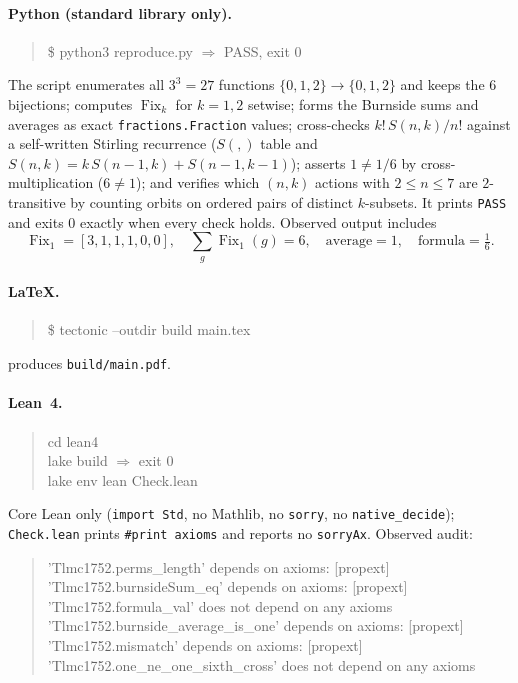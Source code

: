 \documentclass[11pt]{article}
\theoremstyle{definition}
\theoremstyle{remark}
\newcommand{\Fix}{\operatorname{Fix}}
\newcommand{\Stir}[2]{S(#1,#2)}
\begin{document}
\paragraph{Python (standard library only).}
\begin{quote}\ttfamily
\$ python3 reproduce.py   $\Rightarrow$   PASS, exit 0
\end{quote}
The script enumerates all $3^3=27$ functions $\{0,1,2\}\to\{0,1,2\}$ and keeps
the $6$ bijections; computes $\Fix_k$ for $k=1,2$ setwise; forms the Burnside
sums and averages as exact \texttt{fractions.Fraction} values; cross-checks
$k!\,\Stir{n}{k}/n!$ against a self-written Stirling recurrence
($\Stir{}{}$ table and $\Stir{n}{k}=k\,\Stir{n-1}{k}+\Stir{n-1}{k-1}$); asserts
$1 \ne 1/6$ by cross-multiplication ($6 \ne 1$); and verifies which $(n,k)$
actions with $2 \le n \le 7$ are $2$-transitive by counting orbits on ordered
pairs of distinct $k$-subsets. It prints \texttt{PASS} and exits $0$ exactly
when every check holds. Observed output includes
\[
\Fix_1 = [3,1,1,1,0,0],\quad \textstyle\sum_g \Fix_1(g)=6,\quad \text{average}=1,
\quad \text{formula}=\tfrac16 .
\]

\paragraph{LaTeX.}
\begin{quote}\ttfamily
\$ tectonic --outdir build main.tex
\end{quote}
produces \texttt{build/main.pdf}.

\paragraph{Lean~4.}
\begin{quote}\ttfamily
cd lean4\\
lake build   $\Rightarrow$   exit 0\\
lake env lean Check.lean
\end{quote}
Core Lean only (\texttt{import Std}, no Mathlib, no \texttt{sorry}, no
\texttt{native\_decide}); \texttt{Check.lean} prints \texttt{\#print axioms}
and reports no \texttt{sorryAx}. Observed audit:
\begin{quote}\ttfamily
'Tlmc1752.perms\_length' depends on axioms: [propext]\\
'Tlmc1752.burnsideSum\_eq' depends on axioms: [propext]\\
'Tlmc1752.formula\_val' does not depend on any axioms\\
'Tlmc1752.burnside\_average\_is\_one' depends on axioms: [propext]\\
'Tlmc1752.mismatch' depends on axioms: [propext]\\
'Tlmc1752.one\_ne\_one\_sixth\_cross' does not depend on any axioms
\end{quote}
\end{document}
